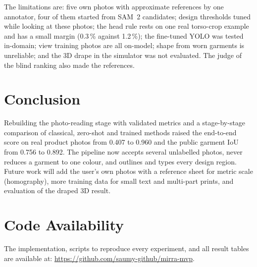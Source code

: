 \documentclass[conference]{IEEEtran}
\begin{document}
The limitations are: five own photos with approximate references by one annotator, four of them started from SAM~2 candidates; design thresholds tuned while looking at these photos; the head rule rests on one real torso-crop example and has a small margin (0.3\,\% against 1.2\,\%); the fine-tuned YOLO was tested in-domain; view training photos are all on-model; shape from worn garments is unreliable; and the 3D drape in the simulator was not evaluated. The judge of the blind ranking also made the references.

\section{Conclusion}
Rebuilding the photo-reading stage with validated metrics and a stage-by-stage comparison of classical, zero-shot and trained methods raised the end-to-end score on real product photos from 0.407 to 0.960 and the public garment IoU from 0.756 to 0.892. The pipeline now accepts several unlabelled photos, never reduces a garment to one colour, and outlines and types every design region. Future work will add the user's own photos with a reference sheet for metric scale (homography), more training data for small text and multi-part prints, and evaluation of the draped 3D result.

\section*{Code Availability}
The implementation, scripts to reproduce every experiment, and all result tables are available at: \url{https://github.com/saumy-github/mirra-mvp}.
\end{document}

